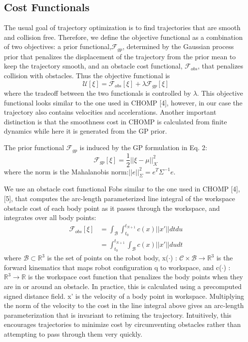 \documentclass{IEEEtran}
\begin{document}
\subsection{Cost Functionals}
The usual goal of trajectory optimization is to find trajectories that are smooth and collision free. Therefore, we define
the objective functional as a combination of two objectives:
a prior functional,$\mathcal{F}_{gp}$, determined by the Gaussian process
prior that penalizes the displacement of the trajectory from
the prior mean to keep the trajectory smooth, and an obstacle
cost functional, $\mathcal{F}_{obs}$, that penalizes collision with obstacles.
Thus the objective functional is
\begin{equation*}
\mathcal{U}[\xi]=\mathcal{F}_{obs}[\xi]+\lambda\mathcal{F}_{gp}[\xi]\tag{18}
\end{equation*}
where the tradeoff between the two functionals is controlled
by $\lambda$. This objective functional looks similar to the one used
in CHOMP [4], however, in our case the trajectory also
contains velocities and accelerations. Another important distinction is that the smoothness cost in CHOMP is calculated
from finite dynamics while here it is generated from the GP
prior.

The prior functional $\mathcal{F}_{gp}$ is induced by the GP formulation
in Eq. 2:
\begin{equation*}
\mathcal{F}_{gp}[\xi]=\frac{1}{2}||\xi-\mu||_{\mathcal{K}}^2\tag{19}
\end{equation*}
where the norm is the Mahalanobis norm:$||e||_\Sigma^2=e^T\Sigma^{-1}e$.

We use an obstacle cost functional Fobs similar to the
one used in CHOMP [4], [5], that computes the arc-length
parameterized line integral of the workspace obstacle cost
of each body point as it passes through the workspace, and
integrates over all body points:
\begin{equation}
\begin{split}
\mathcal{F}_{obs}[\xi]&=\int_\mathcal{B}^{}\int_{t_0}^{t_{N+1}}c(x)||x'||dtdu\\
&=\int_{t_0}^{t_{N+1}}\int_\mathcal{B}^{}c(x)||x'||dudt
\end{split}
\tag{20}
\end{equation}
where $\mathcal{B} \subset \mathbb{R}^3$
is the set of points on the robot body,
x($\cdot$) : $\mathcal{C} \times \mathcal{B} \rightarrow \mathbb{R}^3$
is the forward kinematics that maps
robot configuration q to workspace, and c($\cdot$) :$ \mathbb{R}^3\rightarrow
 \mathbb{R}$ is the workspace cost function that penalizes the body points
when they are in or around an obstacle. In practice, this is
calculated using a precomputed signed distance field. x'
is
the velocity of a body point in workspace. Multiplying the
norm of the velocity to the cost in the line integral above
gives an arc-length parameterization that is invariant to retiming the trajectory. Intuitively, this encourages trajectories
to minimize cost by circumventing obstacles rather than
attempting to pass through them very quickly.
\end{document}
